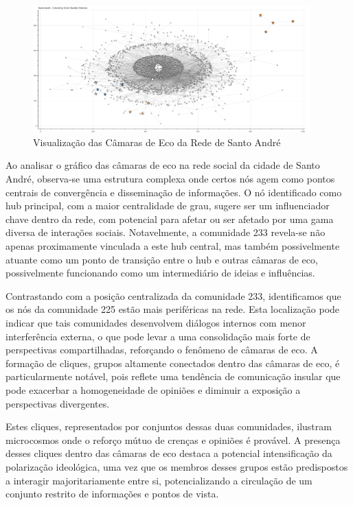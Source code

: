 \begin{figure}[htb]
	\centering
	\includegraphics[width=0.95\textwidth]{images/echo_chambers_santo_andre.png}
	\caption{Visualização das Câmaras de Eco da Rede de Santo André}
	\label{fig:echo_chambers_santo_andre}
\end{figure}

Ao analisar o gráfico das câmaras de eco na rede social da cidade de Santo André, observa-se uma estrutura complexa onde certos nós agem como pontos centrais de convergência e disseminação de informações. O nó identificado como hub principal, com a maior centralidade de grau, sugere ser um influenciador chave dentro da rede, com potencial para afetar ou ser afetado por uma gama diversa de interações sociais. Notavelmente, a comunidade 233 revela-se não apenas proximamente vinculada a este hub central, mas também possivelmente atuante como um ponto de transição entre o hub e outras câmaras de eco, possivelmente funcionando como um intermediário de ideias e influências.

Contrastando com a posição centralizada da comunidade 233, identificamos que os nós da comunidade 225 estão mais periféricas na rede. Esta localização pode indicar que tais comunidades desenvolvem diálogos internos com menor interferência externa, o que pode levar a uma consolidação mais forte de perspectivas compartilhadas, reforçando o fenômeno de câmaras de eco. A formação de cliques, grupos altamente conectados dentro das câmaras de eco, é particularmente notável, pois reflete uma tendência de comunicação insular que pode exacerbar a homogeneidade de opiniões e diminuir a exposição a perspectivas divergentes.

Estes cliques, representados por conjuntos dessas duas comunidades, ilustram microcosmos onde o reforço mútuo de crenças e opiniões é provável. A presença desses cliques dentro das câmaras de eco destaca a potencial intensificação da polarização ideológica, uma vez que os membros desses grupos estão predispostos a interagir majoritariamente entre si, potencializando a circulação de um conjunto restrito de informações e pontos de vista.

